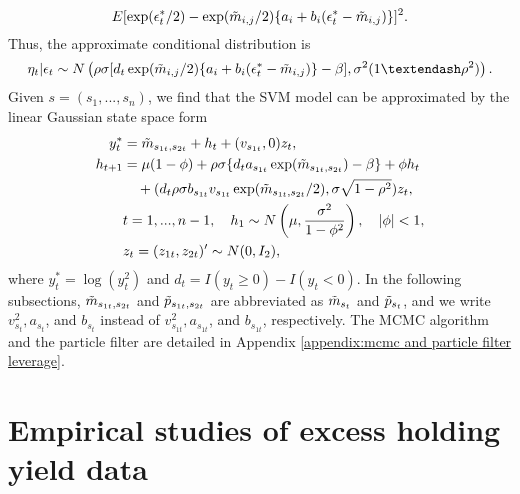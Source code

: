 \begin{equation*}
    E[ \exp(\epsilon_t^*/2) - \exp(\Tilde{m}_{i,j}/2) \{ a_i + b_i(\epsilon_t^* - \Tilde{m}_{i,j}) \} ]^2.
\end{equation*}
Thus, the approximate conditional distribution is 
\begin{equation*}
    \eta_t|\epsilon_t \sim N\left(\rho \sigma [ d_t \exp(\Tilde{m}_{i,j}/2) \{ a_i + b_i(\epsilon_t^* - \Tilde{m}_{i,j}) \} - \beta ], \sigma^2(1–\rho^2)\right).
\end{equation*}
Given $s = (s_1, ..., s_n)$, we find that the SVM model can be approximated by the linear Gaussian state space form
\begin{align}
    y_t^* &= \Tilde{m}_{s_{1t}, s_{2t}} + h_t + (v_{s_{1t}}, 0) z_t, \label{approx_linaer_start} \\
    h_{t+1} &= \mu(1-\phi) + \rho \sigma \{ d_t a_{s_{1t}} \exp(\Tilde{m}_{s_{1t}, s_{2t}}) - \beta \} + \phi h_t \\
    &\quad + (d_t \rho \sigma b_{s_{1t}} v_{s_{1t}} \exp(\Tilde{m}_{s_{1t}, s_{2t}}/2), \sigma \sqrt{1-\rho^2}) z_t, \nonumber \\
    &t = 1,...,n-1, \quad h_1 \sim N\left( \mu, \frac{\sigma^2}{1-\phi^2} \right), \quad
    |\phi| < 1, \label{approx_linaer_end} \\
    &z_t = (z_{1t}, z_{2t})' \sim N(0, I_2), \nonumber
\end{align}
where $y_t^* = \log(y_t^2)$ and $d_t = I(y_t \geq 0) - I(y_t < 0)$. 
In the following subsections, $\Tilde{m}_{s_{1t}, s_{2t}}$ and $\Tilde{p}_{s_{1t}, s_{2t}}$ are abbreviated as $\Tilde{m}_{s_t}$ and $\Tilde{p}_{s_t}$, and we write $v_{s_t}^2, a_{s_t}$, and $b_{s_t}$ instead of $v_{s_{1t}}^2, a_{s_{1t}}$, and $b_{s_{1t}}$, respectively. The MCMC algorithm and the particle filter are detailed in Appendix \ref{appendix:mcmc and particle filter leverage}.


\section{Empirical studies of excess holding yield data} \label{Empirical studies}
